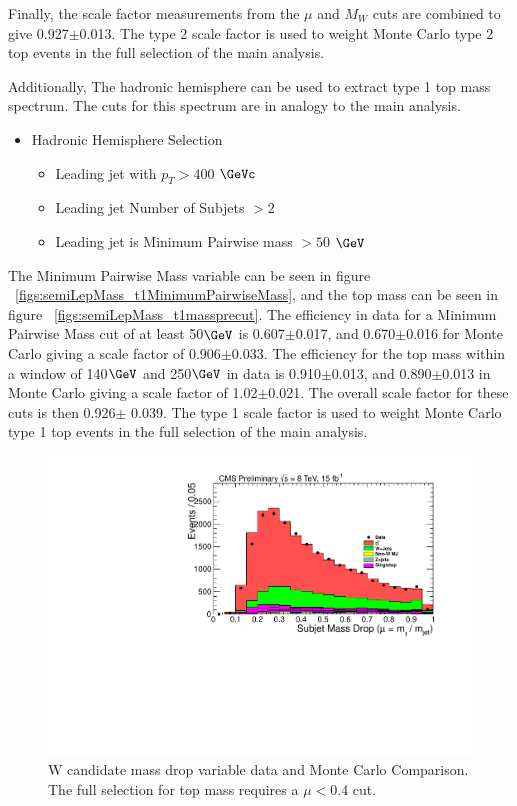 Finally, the scale factor measurements from the $\mu$ and $M_W$ cuts are combined to give 0.927$\pm$0.013.  The type 2 scale factor is used to weight 
Monte Carlo type 2 top events in the full selection of the main analysis.

Additionally, The hadronic hemisphere can be used to extract type 1 top mass spectrum.  The cuts for this spectrum are in analogy to the main analysis.  
\begin{itemize}
\item Hadronic Hemisphere Selection
\begin{itemize}
\item Leading jet with $p_T > 400$ $\GeVc$
\item Leading jet Number of Subjets $> 2$
\item Leading jet is Minimum Pairwise mass  $> 50$ $\GeV$
\end{itemize}
\end{itemize}

The Minimum Pairwise Mass variable can be seen in figure ~\ref{figs:semiLepMass_t1MinimumPairwiseMass}, and the top mass can be seen 
in figure ~\ref{figs:semiLepMass_t1massprecut}. 
The efficiency in data for a Minimum Pairwise Mass cut of at least 50$\GeV$ is 0.607$\pm$0.017, and 0.670$\pm$0.016 for Monte Carlo giving a scale factor of 0.906$\pm$0.033.  
The efficiency for the top mass within a window of 140$\GeV$ and 250$\GeV$ in data is 0.910$\pm$0.013, and 0.890$\pm$0.013 in Monte Carlo giving a scale factor of 1.02$\pm$0.021.  
The overall scale factor for these cuts is then 0.926$\pm$ 0.039.  The type 1 scale factor is used to weight Monte Carlo type 1 top events in the full selection of the main analysis.

\begin{figure}[htcb]
\centering
\includegraphics[width=1.0\textwidth]{figs/semiLepMass_muHist.pdf}
\caption{W candidate mass drop variable data and Monte Carlo Comparison.  The full selection for top mass requires a $\mu < 0.4$ cut.}
\label{figs:semiLepMass_muHist}
\end{figure}

